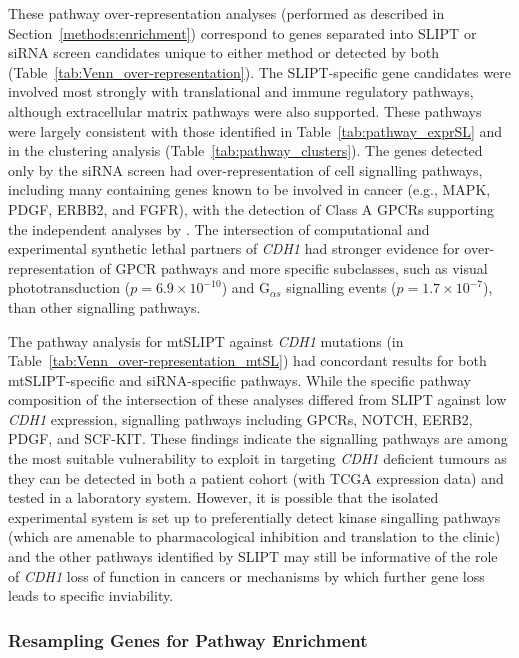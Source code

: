 These pathway over-representation analyses (performed as described in Section~\ref{methods:enrichment}) correspond to genes separated into \gls{SLIPT} or siRNA screen candidates unique to either method or detected by both (Table~\ref{tab:Venn_over-representation}). The \gls{SLIPT}-specific gene candidates were involved most strongly with translational and immune regulatory pathways, although extracellular matrix pathways were also supported. These pathways were largely consistent with those identified in Table~\ref{tab:pathway_exprSL} and in the clustering analysis (Table~\ref{tab:pathway_clusters}). The genes detected only by the siRNA screen had over-represent\-ation of cell signalling pathways, including many containing genes known to be involved in cancer (e.g., MAPK, PDGF, ERBB2, and FGFR), with the detection of Class A GPCRs supporting the independent analyses by \citet{Telford2015}. The intersection of computational and experimental synthetic lethal partners of \textit{CDH1} had stronger evidence for over-represent\-ation of GPCR pathways and more specific subclasses, such as visual phototransduction ($p=6.9 \times 10^{-10}$) and G$_{\alpha s}$ signalling events ($p=1.7 \times 10^{-7}$), than other signalling pathways.

The pathway analysis for mtSLIPT against \textit{CDH1} mutations (in Table~\ref{tab:Venn_over-representation_mtSL}) had concordant results for both mtSLIPT-specific and siRNA-specific pathways. While the specific pathway composition of the intersection of these analyses differed from \gls{SLIPT} against low \textit{CDH1} expression, signalling pathways including GPCRs, NOTCH, EERB2, PDGF, and SCF-KIT. These findings indicate the signalling pathways are among the most suitable vulnerability to exploit in targeting \textit{CDH1} deficient tumours as they can be detected in both a patient cohort (with TCGA expression data) and tested in a laboratory system. However, it is possible that the isolated experimental system is set up to preferentially detect kinase singalling pathways (which are amenable to pharmacological inhibition and translation to the clinic) and the other pathways identified by \gls{SLIPT} may still be informative of the role of \textit{CDH1} loss of function in cancers or mechanisms by which further gene loss leads to specific inviability.



\FloatBarrier

\subsubsection{Resampling Genes for Pathway Enrichment} \label{chapt3:compare_pathway_perm}

